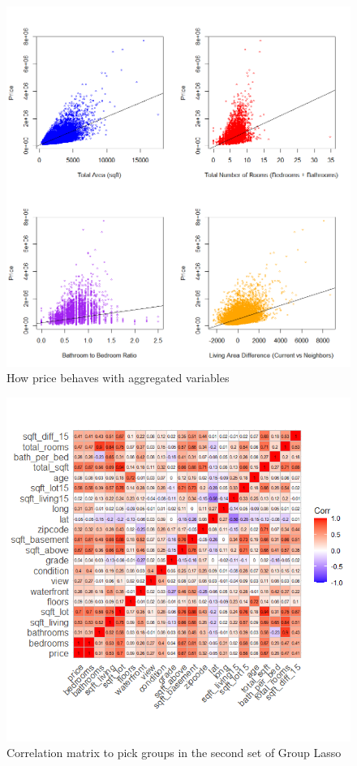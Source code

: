 \documentclass[a4paper, 11pt]{article}
\begin{document}
\begin{figure}[h]
\includegraphics[scale=0.5]{corrplots}
\centering
\caption{How price behaves with aggregated variables}
\label{fig:corrplots}
\end{figure}

\begin{figure}[H]
\includegraphics[scale=0.7]{corrmatplot}
\centering
\caption{Correlation matrix to pick groups in the second set of Group Lasso}
\label{fig:corrmatplot}
\end{figure}
\end{document}
